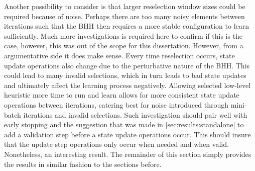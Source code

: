 Another possibility to consider is that larger reselection window sizes could be required because of noise. Perhaps there are too many noisy elements between iterations such that the \Ac{BHH} then requires a more stable configuration to learn sufficiently. Much more investigations is required here to confirm if this is the case, however, this was out of the scope for this dissertation. However, from a argumentative side it does make sense. Every time reselection occurs, state update operations also change due to the perturbative nature of the \Ac{BHH}. This could lead to many invalid selections, which in turn leads to bad state updates and ultimately affect the learning process negatively. Allowing selected low-level heuristic more time to run and learn allows for more consistent state update operations between iterations, catering best for noise introduced through mini-batch iterations and invalid selections.  Such investigation should pair well with early stopping and the suggestion that was made in \ref{sec:results:standalone} to add a validation step before a state update operations occur. This should insure that the update step operations only occur when needed and when valid. Nonetheless, an interesting result. The remainder of this section simply provides the results in similar fashion to the sections before.

